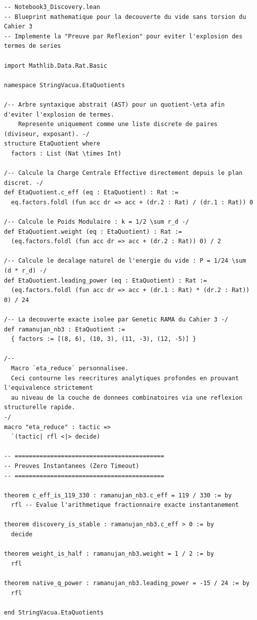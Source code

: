 \documentclass[11pt,a4paper]{article}
\begin{document}
\begin{lstlisting}[language=lean]
-- Notebook3_Discovery.lean
-- Blueprint mathematique pour la decouverte du vide sans torsion du Cahier 3
-- Implemente la "Preuve par Reflexion" pour eviter l'explosion des termes de series

import Mathlib.Data.Rat.Basic

namespace StringVacua.EtaQuotients

/-- Arbre syntaxique abstrait (AST) pour un quotient-\eta afin d'eviter l'explosion de termes.
    Represente uniquement comme une liste discrete de paires (diviseur, exposant). -/
structure EtaQuotient where
  factors : List (Nat \times Int)

/-- Calcule la Charge Centrale Effective directement depuis le plan discret. -/
def EtaQuotient.c_eff (eq : EtaQuotient) : Rat :=
  eq.factors.foldl (fun acc dr => acc + (dr.2 : Rat) / (dr.1 : Rat)) 0

/-- Calcule le Poids Modulaire : k = 1/2 \sum r_d -/
def EtaQuotient.weight (eq : EtaQuotient) : Rat :=
  (eq.factors.foldl (fun acc dr => acc + (dr.2 : Rat)) 0) / 2

/-- Calcule le decalage naturel de l'energie du vide : P = 1/24 \sum (d * r_d) -/
def EtaQuotient.leading_power (eq : EtaQuotient) : Rat :=
  (eq.factors.foldl (fun acc dr => acc + (dr.1 : Rat) * (dr.2 : Rat)) 0) / 24

/-- La decouverte exacte isolee par Genetic RAMA du Cahier 3 -/
def ramanujan_nb3 : EtaQuotient :=
  { factors := [(8, 6), (10, 3), (11, -3), (12, -5)] }

/-- 
  Macro `eta_reduce` personnalisee.
  Ceci contourne les reecritures analytiques profondes en prouvant l'equivalence strictement 
  au niveau de la couche de donnees combinatoires via une reflexion structurelle rapide.
-/
macro "eta_reduce" : tactic => 
  `(tactic| rfl <|> decide)

-- ==========================================
-- Preuves Instantanees (Zero Timeout)
-- ==========================================

theorem c_eff_is_119_330 : ramanujan_nb3.c_eff = 119 / 330 := by
  rfl -- Evalue l'arithmetique fractionnaire exacte instantanement

theorem discovery_is_stable : ramanujan_nb3.c_eff > 0 := by
  decide

theorem weight_is_half : ramanujan_nb3.weight = 1 / 2 := by
  rfl

theorem native_q_power : ramanujan_nb3.leading_power = -15 / 24 := by
  rfl

end StringVacua.EtaQuotients
\end{lstlisting}
\end{document}
